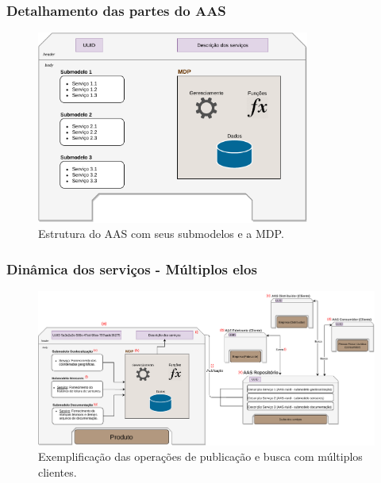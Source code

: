 \documentclass[10pt]{beamer}
\begin{document}
\begin{frame}
	\frametitle{Detalhamento das partes do AAS}
	
	\begin{figure}[htb]
		\centering
		\caption{Estrutura do AAS com seus submodelos e a MDP.}
		\label{fig:estrutura-aas}
		\includegraphics[width=0.8\textwidth]{estrutura-aas}
	\end{figure}
	
\end{frame}
\begin{frame}
	\frametitle{Dinâmica dos serviços - Múltiplos elos}
	
	\begin{figure}[htb]
		\centering
		\caption{Exemplificação das operações de publicação e busca com múltiplos clientes.}
		\label{fig:webservice-multielo}
		\includegraphics[width=1\textwidth]{webservice-multielo}
	\end{figure}
	
\end{frame}
\end{document}
